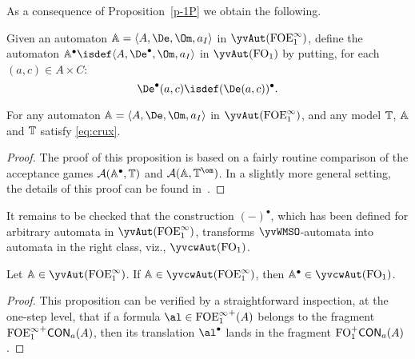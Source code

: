 \noindent{}

As a consequence of Proposition~\ref{p-1P} we obtain the following.

\begin{definition}
Given an automaton $\bbA = \tup{A,\De,\Om,a_{I}}$ in $\yvAut(\olque)$, define 
the automaton $\bbA^{\bullet} \isdef \tup{A,\De^{\bullet},\Om,a_{I}}$ in 
$\yvAut(\ofo)$ by putting, for each $(a,c) \in A \times C$:
\[
\De^{\bullet}(a,c) \isdef (\De(a,c))^{\bullet}.
\]
\end{definition}

\begin{proposition}
For any automaton $\bbA = \tup{A,\De,\Om,a_{I}}$ in $\yvAut(\olque)$, and any
model $\mathbb{T}$, $\mathbb{A}$ and $\mathbb{T}$ satisfy \eqref{eq:crux}.
\end{proposition}

\begin{proof}
The proof of this proposition is based on a fairly routine comparison of the 
acceptance games $\mathcal{A}(\mathbb{A}^{\bullet},\mathbb{T})$ and 
$\mathcal{A}(\bbA,\bbT^{\om})$.
In a slightly more general setting, the details of this proof can be found 
in~\cite{Venxx}.
\end{proof}
\medskip

It remains to be checked that the construction $(-)^{\bullet}$, which has
been defined for arbitrary automata in $\yvAut(\olque)$, transforms 
$\yvWMSO$-automata into automata in the right class, viz., $\yvcwAut(\ofo)$.

\begin{proposition}
Let $\bbA \in \yvAut(\olque)$.
If $\bbA \in \yvcwAut(\olque)$, then $\bbA^{\bullet} \in \yvcwAut(\ofo)$.
\end{proposition}

\begin{proof}
This proposition can be verified by a straightforward inspection, at the 
one-step level, that if a formula $\al \in {\olque}^+(A)$ belongs to the fragment 
${\mathrm{FOE}^{\infty}_1}^+\mathsf{CON}_{a}(A)$, then its translation $\al^{\bullet}$ lands in 
the fragment $\mathrm{FO}_1^+\mathsf{CON}_{a}(A)$.
\end{proof}

